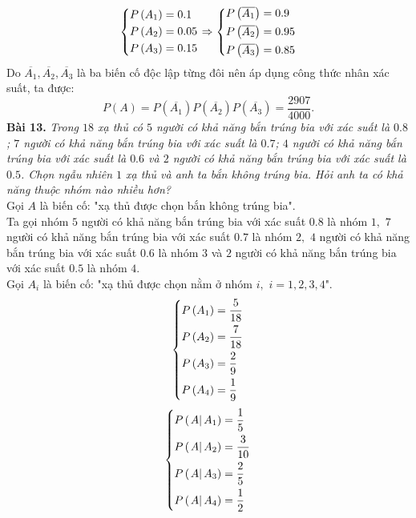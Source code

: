 \documentclass[12pt,a4paper]{article}
\begin{document}
$$\left\{ \begin{gathered}
  P\left( {{A_1}} \right) = 0.1 \hfill \\
  P\left( {{A_2}} \right) = 0.05 \hfill \\
  P\left( {{A_3}} \right) = 0.15 \hfill \\ 
\end{gathered}  \right. \Rightarrow \left\{ \begin{gathered}
  P\left( {\overline {{A_1}} } \right) = 0.9 \hfill \\
  P\left( {\overline {{A_2}} } \right) = 0.95 \hfill \\
  P\left( {\overline {{A_3}} } \right) = 0.85 \hfill \\ 
\end{gathered}  \right.$$
Do $\overline{A_1}, \overline{A_2},\overline{A_3}$ là ba biến cố độc lập từng đôi nên áp dụng công thức nhân xác suất, ta được:
$$P\left( A \right) = P\left( {\overline {{A_1}} } \right)P\left( {\overline {{A_2}} } \right)P\left( {\overline {{A_3}} } \right) = \frac{{2907}}{{4000}}.$$
\textbf{Bài 13.} \textit{Trong $18$ xạ thủ có $5$ người có khả năng bắn trúng bia với xác suất là $0.8$; $7$ người có khả năng bắn trúng bia với xác suất là $0.7$; $4$ người có khả năng bắn trúng bia với xác suất là $0.6$ và $2$ người có khả năng bắn trúng bia với xác suất là $0.5$. Chọn  ngẫu  nhiên  $1$  xạ  thủ  và  anh  ta  bắn  không  trúng  bia.  Hỏi  anh  ta  có  khả  năng thuộc nhóm nào nhiều hơn?}\\
Gọi $A$ là biến cố: "xạ thủ được chọn bắn không trúng bia".\\
Ta gọi nhóm $5$ người có khả năng bắn trúng bia với xác suất $0.8$ là nhóm $1,$ $7$ người có khả năng bắn trúng bia với xác suất $0.7$ là nhóm $2,$ $4$ người có khả năng bắn trúng bia với xác suất $0.6$ là nhóm $3$ và $2$ người có khả năng bắn trúng bia với xác suất $0.5$ là nhóm $4.$\\
Gọi $A_i$ là biến cố: "xạ thủ được chọn nằm ở nhóm $i,$ $i = 1, 2, 3, 4$".\\
$$\left\{ \begin{gathered}
  P\left( {{A_1}} \right) = \frac{5}{{18}} \hfill \\
  P\left( {{A_2}} \right) = \frac{7}{{18}} \hfill \\
  P\left( {{A_3}} \right) = \frac{2}{9} \hfill \\
  P\left( {{A_4}} \right) = \frac{1}{9} \hfill \\ 
\end{gathered}  \right.$$
$$\left\{ \begin{gathered}
  P\left( {\left. A \right|{A_1}} \right) = \frac{1}{5} \hfill \\
  P\left( {\left. A \right|{A_2}} \right) = \frac{3}{{10}} \hfill \\
  P\left( {\left. A \right|{A_3}} \right) = \frac{2}{5} \hfill \\
  P\left( {\left. A \right|{A_4}} \right) = \frac{1}{2} \hfill \\ 
\end{gathered}  \right.$$
\end{document}
